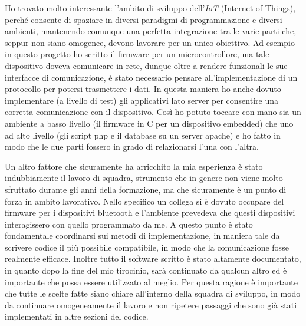 \documentclass[a4paper,12pt]{article}
\begin{document}
Ho trovato molto interessante l'ambito di sviluppo dell'\textit{IoT} (Internet of Things), perch\'e consente di spaziare in diversi paradigmi di programmazione e diversi ambienti, mantenendo comunque una perfetta integrazione tra le varie parti che, seppur non siano omogenee, devono lavorare per un unico obiettivo. Ad esempio in questo progetto ho scritto il firmware per un microcontrollore, ma tale dispositivo doveva comunicare in rete, dunque oltre a rendere funzionali le sue interfacce di comunicazione, \`e stato necessario pensare all'implementazione di un protocollo per potersi trasmettere i dati. In questa maniera ho anche dovuto implementare (a livello di test) gli applicativi lato server per consentire una corretta comunicazione con il dispositivo. Cos\`i ho potuto toccare con mano sia un ambiente a basso livello (il firmware in C per un dispositivo embedded) che uno ad alto livello (gli script php e il database su un server apache) e ho fatto in modo che le due parti fossero in grado di relazionarsi l'una con l'altra.

Un altro fattore che sicuramente ha arricchito la mia esperienza \`e stato indubbiamente il lavoro di squadra, strumento che in genere non viene molto sfruttato durante gli anni della formazione, ma che sicuramente \`e un punto di forza in ambito lavorativo. Nello specifico un collega si \`e dovuto occupare del firmware per i dispositivi bluetooth e l'ambiente prevedeva che questi dispositivi interagissero con quello programmato da me. A questo punto \`e stato fondamentale coordinarsi sui metodi di implementazione, in maniera tale da scrivere codice il pi\`u possibile compatibile, in modo che la comunicazione fosse realmente efficace. Inoltre tutto il software scritto \`e stato altamente documentato, in quanto dopo la fine del mio tirocinio, sar\`a continuato da qualcun altro ed \`e importante che possa essere utilizzato al meglio. Per questa ragione \`e importante che tutte le scelte fatte siano chiare all'interno della squadra di sviluppo, in modo da continuare omogeneamente il lavoro e non ripetere passaggi che sono gi\`a stati implementati in altre sezioni del codice.
\end{document}
